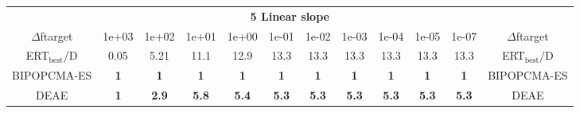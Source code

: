 \begin{tabular}{cccccccccccc}
 & \multicolumn{10}{c}{{\normalsize \textbf{5 Linear slope}}}\\
$\Delta$ftarget& 1e+03& 1e+02& 1e+01& 1e+00& 1e-01& 1e-02& 1e-03& 1e-04& 1e-05& 1e-07 & $\Delta$ftarget \\
ERT$_{\textrm{best}}$/D& 0.05& 5.21& 11.1& 12.9& 13.3& 13.3& 13.3& 13.3& 13.3& 13.3 & ERT$_{\textrm{best}}$/D \\
\hline
BIPOPCMA-ES & \textbf{1} & \textbf{1} & \textbf{1} & \textbf{1} & \textbf{1} & \textbf{1} & \textbf{1} & \textbf{1} & \textbf{1} & \textbf{1} & BIPOPCMA-ES \cite{add_an_entry_for_BIPOPCMA-ES_in_bbob.bib}\\
DEAE & \textbf{1} & \textbf{2.9} & \textbf{5.8} & \textbf{5.4} & \textbf{5.3} & \textbf{5.3} & \textbf{5.3} & \textbf{5.3} & \textbf{5.3} & \textbf{5.3} & DEAE \cite{add_an_entry_for_DEAE_in_bbob.bib}
\end{tabular}
